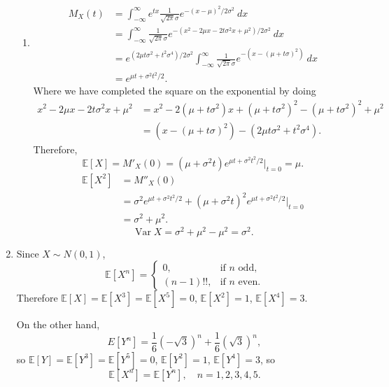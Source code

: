 \documentclass{article}
\DeclareMathOperator{\var}{Var}
\begin{document}
\begin{enumerate}
\begin{enumerate}
        \item \begin{align*}
            M_X(t) 
            &= \int_{-\infty}^{\infty} e^{tx} \frac{1}{\sqrt{2\pi}\sigma} e^{-(x - \mu)^2 / 2\sigma^2} \ dx \\
            &= \int_{-\infty}^{\infty} \frac{1}{\sqrt{2\pi}\sigma} 
            e^{-(x^2 - 2\mu x - 2t\sigma^2 x + \mu^2) / 2\sigma^2} \ dx \\
            &= e^{(2\mu t\sigma^2 + t^2 \sigma^4) / 2\sigma^2} \int_{-\infty}^{\infty} 
            \frac{1}{\sqrt{2\pi}\sigma} e^{-(x - (\mu + t\sigma)^2)} \ dx \\
            &= e^{\mu t + \sigma^2 t^2 / 2}.
        \end{align*}
        Where we have completed the square on the exponential by doing 
        \begin{align*}
            x^2 - 2\mu x - 2t\sigma^2 x + \mu^2 
            &= x^2 - 2(\mu + t\sigma^2)x + (\mu + t\sigma^2)^2 - (\mu + t\sigma^2)^2 + \mu^2 \\
            &= (x - (\mu + t\sigma)^2) - (2\mu t \sigma^2 + t^2 \sigma^4).
        \end{align*}
        Therefore, 
        \[ \mathbb{E}[X] = M'_X(0) = (\mu + \sigma^2 t)e^{\mu t + \sigma^2 t^2 / 2} |_{t = 0} = \mu. \]
        \begin{align*}
            \mathbb{E}[X^2] 
            &= M''_X(0) \\
            &= \sigma^2 e^{\mu t + \sigma^2 t^2 / 2} + (\mu + \sigma^2 t)^2 e^{\mu t + \sigma^2 t^2 / 2} 
            |_{t = 0} \\
            &= \sigma^2 + \mu^2.
        \end{align*}
        \[ \var{X} = \sigma^2 + \mu^2 - \mu^2 = \sigma^2. \]
    \end{enumerate}

    \item Since $X \sim N(0, 1)$, 
    \[ \mathbb{E}[X^n] = \begin{cases}
        0, & \text{if } n \text{ odd}, \\
        (n - 1)!!, & \text{if } n \text{ even}.
    \end{cases} \]
    Therefore $\mathbb{E}[X] = \mathbb{E}[X^3] = \mathbb{E}[X^5] = 0$, $\mathbb{E}[X^2] = 1$, 
    $\mathbb{E}[X^4] = 3$.

   On the other hand, 
   \[ E[Y^n] = \frac{1}{6}(-\sqrt{3})^n + \frac{1}{6}(\sqrt{3})^n, \]
   so $\mathbb{E}[Y] = \mathbb{E}[Y^3] = \mathbb{E}[Y^5] = 0$, $\mathbb{E}[Y^2] = 1$, 
   $\mathbb{E}[Y^4] = 3$, so 
   \[ \mathbb{E}[X^n] = \mathbb{E}[Y^n], \quad n = 1, 2, 3, 4, 5. \]

\end{enumerate}
\end{document}
